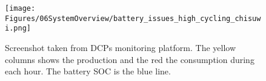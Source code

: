 \begin{figure}[h]
    \centering
    \texttt{[image: Figures/06SystemOverview/battery\_issues\_high\_cycling\_chisuwi.png]}
    \caption[Current control system weakness 2 - High SOC cycling]{Screenshot taken from DCPs monitoring platform. The yellow columns shows the production and the red the consumption during each hour. The battery SOC is the blue line.}
    \label{fig:battery_issues_high_cycling_chisuwi}
\end{figure}
